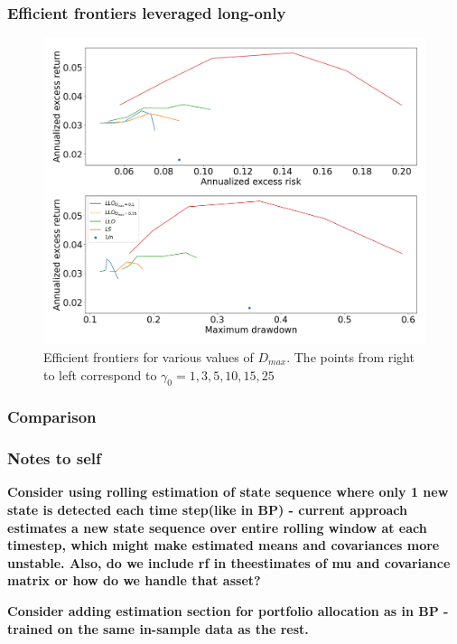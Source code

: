 \subsubsection*{Efficient frontiers leveraged long-only}

\begin{figure}[H]
    \centering
    \includegraphics[width=1\textwidth]{analysis/portfolio_exercise/images/mle/frontier_llo.png}
    \caption[Efficient frontiers for various values of $D_{max}$]{Efficient frontiers for various values of $D_{max}$. The points from right to left correspond to $\gamma_0=1,3,5,10,15,25$}
    \label{fig:MPC_frontier_llo}
\end{figure}

\subsubsection{Comparison}



\subsubsection{Notes to self}


\textbf{Consider using rolling estimation of state sequence where only 1 new state is detected each time step(like in BP) - current approach estimates a new state sequence over entire rolling window at each timestep, which might make estimated means and covariances more unstable. Also, do we include rf in theestimates of mu and covariance matrix or how do we handle that asset?}

\textbf{Consider adding estimation section for portfolio allocation as in BP - trained on the same in-sample data as the rest.}